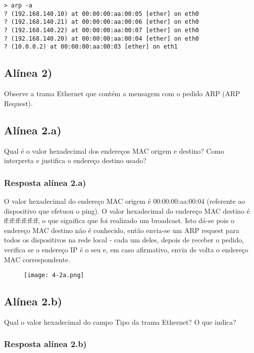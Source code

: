 \documentclass{article}
\begin{document}
\begin{lstlisting}
> arp -a
? (192.168.140.10) at 00:00:00:aa:00:05 [ether] on eth0
? (192.168.140.21) at 00:00:00:aa:00:06 [ether] on eth0
? (192.168.140.22) at 00:00:00:aa:00:07 [ether] on eth0
? (192.168.140.20) at 00:00:00:aa:00:04 [ether] on eth0
? (10.0.0.2) at 00:00:00:aa:00:03 [ether] on eth1
\end{lstlisting}

\subsection{Alínea 2)}

Observe a trama Ethernet que contém a mensagem com o pedido ARP (ARP Request).

\subsection{Alínea 2.a)}

Qual é o valor hexadecimal dos endereços MAC origem e destino? Como interpreta e justifica o endereço destino
usado?

\subsubsection{Resposta alínea 2.a)}

O valor hexadecimal do endereço MAC origem é 00:00:00:aa:00:04 (referente ao dispositivo que efetuou o ping). O valor hexadecimal do endereço MAC destino é ff:ff:ff:ff:ff:ff, o que significa que foi realizado um broadcast. Isto dá-se pois o endereço MAC destino não é conhecido, então envia-se um ARP request para todos os dispositivos na rede local - cada um deles, depois de receber o pedido, verifica se o endereço IP é o seu e, em caso afirmativo, envia de volta o endereço MAC correspondente.

\begin{figure}[h]
    \centering
    \texttt{[image: 4-2a.png]}
\end{figure}

\subsection{Alínea 2.b)}

Qual o valor hexadecimal do campo Tipo da trama Ethernet? O que indica?

\subsubsection{Resposta alínea 2.b)}
\end{document}
